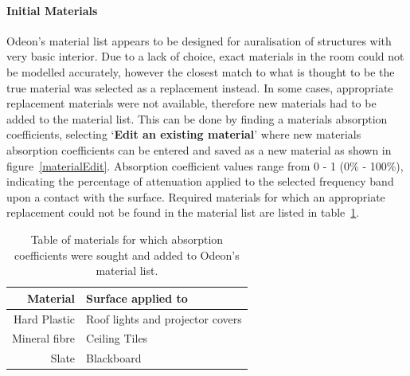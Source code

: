 \documentclass[../../main.tex]{subfiles}
\begin{document}
		\paragraph{Initial Materials}

			Odeon's material list appears to be designed for auralisation of structures with very basic interior. Due to a lack of choice, exact materials in the room could not be modelled accurately, however the closest match to what is thought to be the true material was selected as a replacement instead. In some cases, appropriate replacement materials were not available, therefore new materials had to be added to the material list. This can be done by finding a materials absorption coefficients, selecting `\textbf{Edit an existing material}' where new materials absorption coefficients can be entered and saved as a new material as shown in figure~\ref{materialEdit}. Absorption coefficient values range from 0 - 1 (0\% - 100\%), indicating the percentage of attenuation applied to the selected frequency band upon a contact with the surface. Required materials for which an appropriate replacement could not be found in the material list are listed in table~\ref{materialTable}.

			\begin{table}[H]
			\begin{center}
				\begin{tabular}{r l}
					\textbf{Material} & \textbf{Surface applied to} \\ \hline
					Hard Plastic \cite{plastic} & Roof lights and projector covers \\
					Mineral fibre \cite{mineralFibre} & Ceiling Tiles \\
					Slate \footnotemark[1] \cite{Kovalchik} & Blackboard \\
				\end{tabular}
			\end{center}
			\caption{Table of materials for which absorption coefficients were sought and added to Odeon's material list.}
			\label{materialTable}
			\end{table}

\end{document}
